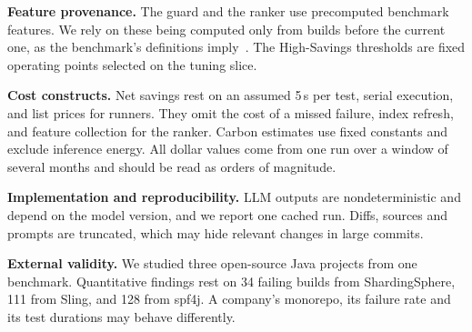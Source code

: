 \textbf{Feature provenance.} The guard and the ranker use precomputed benchmark features. We rely on these being computed only from builds before the current one, as the benchmark's definitions imply~\cite{yaraghi2023tcpci}. The High-Savings thresholds are fixed operating points selected on the tuning slice.

\textbf{Cost constructs.} Net savings rest on an assumed 5\,s per test, serial execution, and list prices for runners. They omit the cost of a missed failure, index refresh, and feature collection for the ranker. Carbon estimates use fixed constants and exclude inference energy. All dollar values come from one run over a window of several months and should be read as orders of magnitude.

\textbf{Implementation and reproducibility.} LLM outputs are nondeterministic and depend on the model version, and we report one cached run. Diffs, sources and prompts are truncated, which may hide relevant changes in large commits.

\textbf{External validity.} We studied three open-source Java projects from one benchmark. Quantitative findings rest on 34 failing builds from ShardingSphere, 111 from Sling, and 128 from spf4j. A company's monorepo, its failure rate and its test durations may behave differently.
